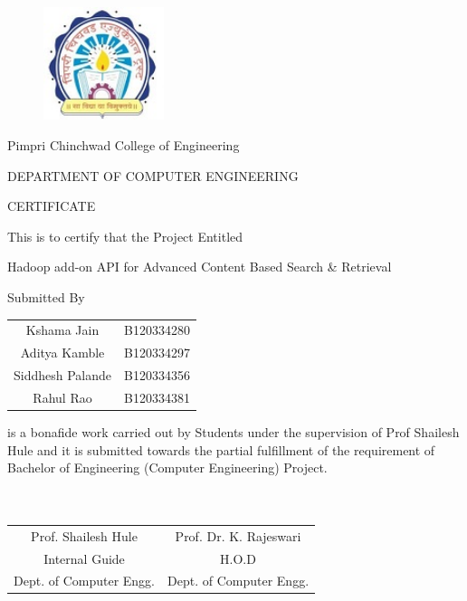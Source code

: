\documentclass[oneside,a4paper,12pt]{report}
\begin{document}
\begin{figure}[ht]
\centering
\includegraphics[width=100pt]{image_pccoelogo.jpg}
\end{figure}


{\bfseries \fontsize{14}{12} \selectfont \centerline{Pimpri Chinchwad College of Engineering}
\centerline{DEPARTMENT OF COMPUTER ENGINEERING}
\vspace*{1\baselineskip}} 


{\bfseries \fontsize{16}{12} \selectfont \centerline{CERTIFICATE} 
\vspace*{1\baselineskip}} 

\centerline{This is to certify that the Project Entitled}
\vspace*{1\baselineskip} 


{\bfseries \fontsize{14}{12} \selectfont \centerline{Hadoop add-on API for Advanced Content Based Search \& Retrieval}
\vspace*{1\baselineskip}}


\begin{center}
Submitted By \\[4ex]
\begin{tabular}{cc}
Kshama Jain  & B120334280 \\
Aditya Kamble  & B120334297 \\
Siddhesh Palande  & B120334356 \\
Rahul Rao  & B120334381 \\[4ex]
\end{tabular}
\end{center}


is a bonafide work carried out by Students under the supervision of Prof Shailesh Hule and it
is submitted towards the partial fulfillment of the requirement of Bachelor of Engineering (Computer Engineering) Project.\\\\\\

\bgroup
\def\arraystretch{0.7}
\begin{tabular}{c c }
Prof. Shailesh Hule &  \hspace{50 mm} Prof. Dr. K. Rajeswari \\								
Internal Guide   &  \hspace{50 mm} H.O.D \\
Dept. of Computer Engg.  &	\hspace{50 mm}Dept. of Computer Engg.  \\
\end{tabular}
\end{document}
